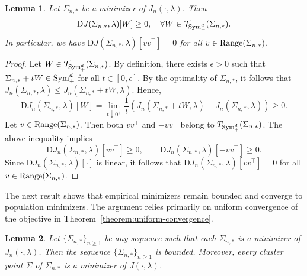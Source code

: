 \documentclass[sn-mathphys-num]{sn-jnl}%
\numberwithin{equation}{section}
\newtheorem{lemma}{Lemma}
\newcommand{\eps}{\epsilon}
\newcommand{\Range}{{\rm Range}}
\newcommand{\T}{\mathcal{T}}
\newcommand{\Sym}{{\rm \mathrm{Sym}}}
\theoremstyle{thmstyleone}%
\theoremstyle{thmstyletwo}%
\theoremstyle{thmstylethree}%
\begin{document}
\vspace{.5em} 
\begin{lemma} 
\label{lemma:empirical-minimizer-stationarity}
Let $\Sigma_{n,*}$ be a minimizer of $J_n(\cdot,\lambda)$. Then 
\begin{equation*}
	\mathrm{D}J(\Sigma_{n, *}, \lambda) [W] \ge 0,~~~\forall W \in \T_{\Sym_+^d} (\Sigma_{n, *}).
\end{equation*}
In particular, we have $\mathrm{D}J(\Sigma_{n, *}, \lambda) [vv^\top] = 0$ for all $v \in \Range(\Sigma_{n, *})$.
\end{lemma} 
\begin{proof}
Let $W \in \T_{\Sym_+^d} (\Sigma_{n, *})$. By definition, there exists $\eps>0$ such that $\Sigma_{n,*} + tW \in \Sym_+^d$
for all $t \in [0,\eps]$. By the optimality of $\Sigma_{n,*}$, it follows that $J_n(\Sigma_{n,*},\lambda) \le J_n(\Sigma_{n,*} + tW,\lambda)$. Hence, 
\begin{equation*}
	\mathrm{D} J_n(\Sigma_{n, *}, \lambda)[W] = 
		\lim_{t \downarrow 0^+} \frac{1}{t} \left(J_n(\Sigma_{n, *} + tW, \lambda) - J_n(\Sigma_{n, *}, \lambda)\right) \ge 0.
\end{equation*}
Let $v \in \Range(\Sigma_{n, *})$. Then both $vv^\top$ and $-vv^\top$ 
belong to $T_{\Sym_+^d} (\Sigma_{n, *})$. The above inequality implies  
\begin{equation*}
	\mathrm{D} J_n(\Sigma_{n, *}, \lambda)[vv^\top] \ge 0, \qquad \mathrm{D} J_n(\Sigma_{n, *}, \lambda)[-vv^\top] \ge 0.
\end{equation*}
Since $\mathrm{D} J_n(\Sigma_{n, *}, \lambda)[\cdot]$ is linear, it follows that $\mathrm{D} J_n(\Sigma_{n, *}, \lambda)[vv^\top] = 0$ 
for all $v \in \Range(\Sigma_{n, *})$.
\end{proof} 

The next result shows that empirical minimizers remain bounded and converge to population minimizers. The 
argument relies primarily on uniform convergence of the objective in Theorem~\ref{theorem:uniform-convergence}.

\vspace{.5em} 
\begin{lemma}
\label{lemma:minimizers-bounded-convergence}
Let $\{\Sigma_{n,*}\}_{n\ge 1}$ be any sequence such that each $\Sigma_{n,*}$ is a minimizer of $J_n(\cdot,\lambda)$. 
Then the sequence $\{\Sigma_{n,*}\}_{n\ge 1}$ is bounded. 
Moreover, every cluster point $\Sigma$ of $\Sigma_{n, *}$ is a minimizer of $J(\cdot, \lambda)$. 
\end{lemma} 
\end{document}
